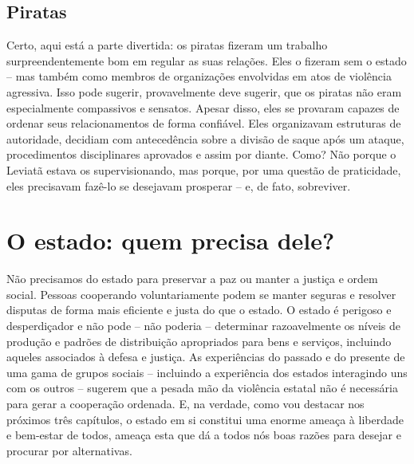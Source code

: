\subsection*{Piratas}

Certo, aqui está a parte divertida: os piratas fizeram um trabalho surpreendentemente bom em regular as suas relações. Eles o fizeram sem o estado -- mas também como membros de organizações envolvidas em atos de violência agressiva. Isso pode sugerir, provavelmente deve sugerir, que os piratas não eram especialmente compassivos e sensatos. Apesar disso, eles se provaram capazes de ordenar seus relacionamentos de forma confiável. Eles organizavam estruturas de autoridade, decidiam com antecedência sobre a divisão de saque após um ataque, procedimentos disciplinares aprovados e assim por diante. Como? Não porque o Leviatã estava os supervisionando, mas porque, por uma questão de praticidade, eles precisavam fazê-lo se desejavam prosperar -- e, de fato, sobreviver.

\section{O estado: quem precisa dele?}

Não precisamos do estado para preservar a paz ou manter a justiça e ordem social. Pessoas cooperando voluntariamente podem se manter seguras e resolver disputas de forma mais eficiente e justa do que o estado. O estado é perigoso e desperdiçador e não pode -- não poderia -- determinar razoavelmente os níveis de produção e padrões de distribuição apropriados para bens e serviços, incluindo aqueles associados à defesa e justiça. As experiências do passado e do presente de uma gama de grupos sociais -- incluindo a experiência dos estados interagindo uns com os outros -- sugerem que a pesada mão da violência estatal não é necessária para gerar a cooperação ordenada. E, na verdade, como vou destacar nos próximos três capítulos, o estado em si constitui uma enorme ameaça à liberdade e bem-estar de todos, ameaça esta que dá a todos nós boas razões para desejar e procurar por alternativas.